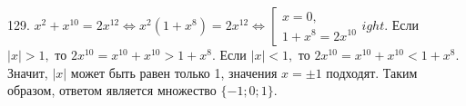 129. $x^2+x^{10}=2x^{12}\Leftrightarrow x^2(1+x^8)=2x^{12}\Leftrightarrow \left[\begin{array}{l} x=0,\\ 1+x^8=2x^{10} \end{array}
ight.$ Если $|x|>1,$ то $2x^{10}=x^{10}+x^{10}>1+x^8.$ Если $|x|<1,$ то $2x^{10}=x^{10}+x^{10}<1+x^8.$ Значит, $|x|$ может быть равен только 1, значения $x=\pm1$ подходят. Таким образом, ответом является множество $\{-1;0;1\}.$\\
